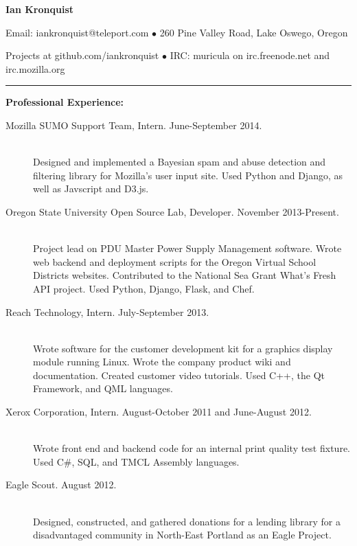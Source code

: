 \documentclass[11pt]{article}
\begin{document}
\centerline{{\LARGE \bf Ian Kronquist}}

\bigskip

\centerline{
	Email: iankronquist@teleport.com
	$\bullet$
	260 Pine Valley Road, Lake Oswego, Oregon
}
\centerline{
	Projects at github.com/iankronquist
	$\bullet$
        IRC: muricula on irc.freenode.net and irc.mozilla.org
}


\bigskip

\hrule

\bigskip

{\Large \bf Professional Experience:}
\normalsize
\begin{description}
	\item[Mozilla SUMO Support Team, Intern.
		\hfill June-September 2014.]
		\hfill \\
		Designed and implemented a Bayesian spam and abuse detection and
		filtering library for Mozilla's user input site.
		Used Python and Django, as well as Javscript and D3.js.

	\item[Oregon State University Open Source Lab, Developer.
		\hfill November 2013-Present.]
		\hfill \\
		Project lead on PDU Master Power Supply Management software.
		Wrote web backend and deployment scripts for the 
		Oregon Virtual School Districts websites. 
		Contributed to the National Sea Grant What's Fresh API project.
		Used Python, Django, Flask, and Chef.

	\item[Reach Technology, Intern.
		\hfill July-September 2013.]
		\hfill \\
		Wrote software for the customer development kit for a graphics
		display module running Linux. Wrote the company product wiki 
		and documentation. Created customer video tutorials. Used C++,
		the Qt Framework, and QML languages.

	\item[Xerox Corporation, Intern.
		\hfill  August-October 2011 and June-August 2012.]
		\hfill \\
		Wrote front end and backend code for an internal print quality
		test fixture.
		Used C\#, SQL, and TMCL Assembly languages.

	\item[Eagle Scout.
		\hfill August 2012.]
		\hfill \\
		Designed, constructed, and gathered donations for a lending library
		for a disadvantaged community in North-East Portland as an Eagle
		Project.
\end{description}
\end{document}
